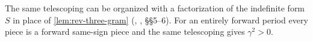 The same telescoping can be organized with a factorization of the indefinite form $S$ in place
of \cref{lem:rev-three-gram} (\cite{Notes}, , \S\S5--6). For an entirely
forward period every piece is a forward same-sign piece and the same telescoping gives
$\gamma^2>0$.
